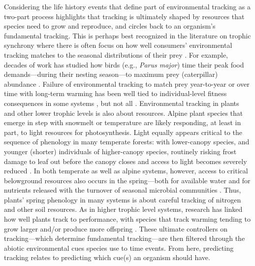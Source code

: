 \documentclass[11pt,letterpaper]{article}
\begin{document}
Considering the life history events that define part of environmental tracking as a two-part process highlights that tracking is ultimately shaped by resources that species need to grow and reproduce, and circles back to an organism's fundamental tracking. This is perhaps best recognized in the literature on trophic synchrony where there is often focus on how well consumers' environmental tracking matches to the seasonal distributions of their prey \citep{deacy2018,kharouba2018}. For example, decades of work has studied how birds (e.g., \emph{Parus major}) time their peak food demands---during their nesting season---to maximum prey (caterpillar) abundance \citep[e.g.,][]{charm2008}. Failure of environmental tracking to match prey year-to-year or over time with long-term warming has been well tied to individual-level fitness consequences in some systems \citep{charm2008}, but not all \citep{visser2006}. Environmental tracking in plants and other lower trophic levels is also about resources. Alpine plant species that emerge in step with snowmelt or temperature are likely responding, at least in part, to light resources for photosynthesis. Light equally appears critical to the sequence of phenology in many temperate forests: with lower-canopy species, and younger (shorter) individuals of higher-canopy species, routinely risking frost damage to leaf out before the canopy closes and access to light becomes severely reduced \citep{Vitasse2013,heberling2019}. In both temperate as well as alpine systems, however, access to critical belowground resources also occurs in the spring---both for available water and for nutrients released with the turnover of seasonal microbial communities \citep{Zak:1990ar,edwards2010N}. Thus, plants' spring phenology in many systems is about careful tracking of nitrogen and other soil resources. As in higher trophic level systems, research has linked how well plants track to performance, with species that track warming tending to grow larger and/or produce more offspring \citep{Cleland:2012}. These ultimate controllers on tracking---which determine fundamental tracking---are then filtered through the abiotic environmental cues species use to time events. From here, predicting tracking relates to predicting which cue(s) an organism should have. 
\end{document}
